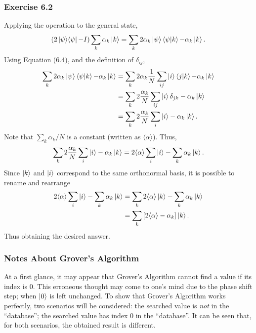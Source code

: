 \subsubsection{Exercise 6.2}
Applying the operation to the general state,
\begin{align}
    (2 \mathop{\mathinner{ |{\psi}\rangle \langle{\psi}|}} - I) \sum_k \alpha_k \ket{k} = 
    \sum_k 2 \alpha_k \ket{\psi} \mathop{\mathinner{ \langle{\psi}|{k}\rangle}} - \alpha_k \ket{k}.
\end{align}
Using Equation (6.4), and the definition of $\delta_{ij}$,
\begin{align}
    \sum_k 2 \alpha_k \ket{\psi} \mathop{\mathinner{ \langle{\psi}|{k}\rangle}} - \alpha_k \ket{k} &=
    \sum_k 2 \alpha_k \frac{1}{N} \sum_{ij} \ket{i} \mathop{\mathinner{ \langle{j}|{k}\rangle}} - \alpha_k \ket{k} \\
    & = \sum_k 2 \frac{\alpha_k}{N} \sum_{ij} \ket{i} \delta_{jk} - \alpha_k \ket{k} \\
    & = \sum_k 2 \frac{\alpha_k}{N} \sum_i \ket{i} - \alpha_k \ket{k}.
\end{align}
Note that $\sum_k \alpha_k/N$ is a constant
(written as $\langle\alpha\rangle$). Thus,
\begin{align}
    \sum_k 2 \frac{\alpha_k}{N} \sum_i \ket{i} - \alpha_k \ket{k} =
    2 \langle\alpha\rangle \sum_i \ket{i} - \sum_k \alpha_k \ket{k}.
\end{align}
Since $\ket{k}$ and $\ket{i}$ correspond to the same orthonormal basis,
it is possible to rename and rearrange
\begin{align}
    2 \langle\alpha\rangle \sum_i \ket{i} - \sum_k \alpha_k \ket{k} &=
    \sum_k 2 \langle\alpha\rangle \ket{k} - \sum_k \alpha_k \ket{k} \\
    &= \sum_k \left[ 2 \langle\alpha\rangle - \alpha_k \right] \ket{k}.
\end{align}
Thus obtaining the desired answer.

\subsubsection{Notes About Grover's Algorithm}
\label{sec:nielsen-and-chuang-notes-on-grovers-algorithm}
At a first glance,
it may appear that Grover's Algorithm cannot find a value if its index is 0.
This erroneous thought may come to one's mind due to the phase shift step;
when $\ket0$ is left unchanged.
To show that Grover's Algorithm works perfectly,
two scenarios will be considered:
the searched value is \emph{not} in the ``database'';
the searched value has index 0 in the ``database''.
It can be seen that, for both scenarios, the obtained result is different.

